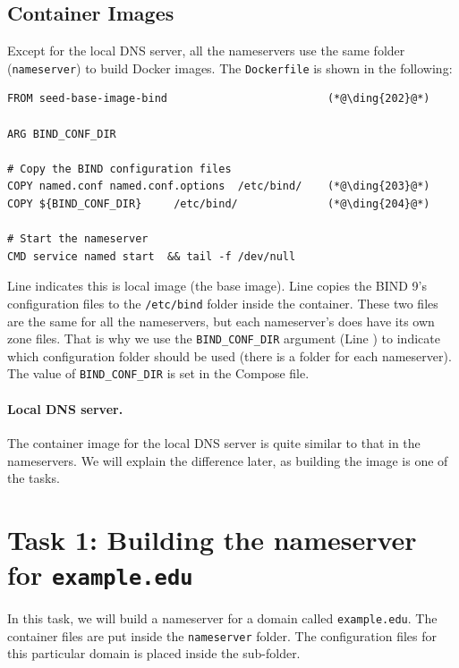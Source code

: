 \subsection{Container Images} 

Except for the local DNS server, all the nameservers use the same 
folder (\texttt{nameserver}) to build Docker images. The 
\texttt{Dockerfile} is shown in the following:  

\begin{lstlisting}
FROM seed-base-image-bind                         (*@\ding{202}@*)

ARG BIND_CONF_DIR

# Copy the BIND configuration files
COPY named.conf named.conf.options  /etc/bind/    (*@\ding{203}@*)
COPY ${BIND_CONF_DIR}     /etc/bind/              (*@\ding{204}@*)

# Start the nameserver
CMD service named start  && tail -f /dev/null
\end{lstlisting}

Line  indicates this is local image (the base image).
Line  copies the BIND 9's configuration files to
the \texttt{/etc/bind} folder inside the container. These two files
are the same for all the nameservers, but each nameserver's 
does have its own zone files. That is why we use 
the \texttt{BIND\_CONF\_DIR} argument (Line ) to 
indicate which configuration folder should be used (there is 
a folder for each nameserver). The value of \texttt{BIND\_CONF\_DIR} 
is set in the Compose file. 


\paragraph{Local DNS server.}
The container image for the local DNS server is quite similar to
that in the nameservers. We will explain the difference later, 
as building the image is one of the tasks. 




\section{Task 1: Building the nameserver for \texttt{example.edu}}

In this task, we will build a nameserver for a domain 
called \texttt{example.edu}. The container files are 
put inside the \texttt{nameserver} folder. 
The configuration files for this particular domain
is placed inside the  sub-folder.  


